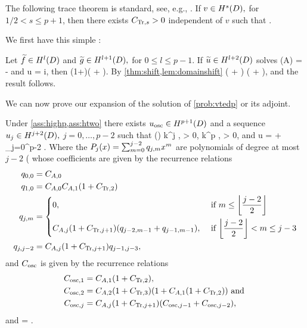 The following trace theorem is standard, see, e.g., \cite[Theorem 3.37]{Mc:00}.
\label{thm:trace}
If $v \in \HsD,$ for $1/2 < s \leq p+1$, then there exists $C_{\mathrm{Tr},s} > 0$ independent of $v$ such that
\beqs
{} \leq \CTrs {}.
\eeqs
\enth

We first have this simple :

\ble\label{lem:domainshift}
Let $\ftilde \in \HlD$ and $\gtilde \in \HlpoD,$ for $0 \leq l \leq p-1$. If $\utilde \in \HlptD$ solves
\beqs
\grad \cdot \mleft(A\grad \utilde\mright) = -\ftilde
\eeqs
and
\beqs
\dn u = i\gtilde,
\eeqs
then
\beqs
\NHlptD{\utilde} \leq \CAl\mleft(1+\CTrlpo\mright)\mleft(\NHlD{\ftilde} + \NHlpoD{\gtilde}\mright).
\eeqs
\ele
{}
By \cref{thm:shift,lem:domainshift}
\beqs
\NHlptD{\utilde} \leq \CAl \mleft(\NHlD{\ftilde} + \NHlphGI{\gtilde}\mright) \leq \CAl \mleft(\NHlD{\ftilde} + \CTrs\NHlpoD{\gtilde}\mright),
\eeqs
and the result follows.
\epf

We can now prove our expansion of the solution of \cref{prob:vtedp} or its adjoint.

\label{thm:expansion}
Under \cref{ass:highp,ass:htwo} there exists $\uosc \in \HppoD$ and a sequence $\usj \in \HjptD,$ $j = 0,\ldots,p-2$ such that
\beq\label{eq:expansionuj}
\NHjptD{\usj} \leq \Pj() k^j \Cfg, \Cj > 0,
\eeq
\beq\label{eq:expansionuosc}
\NHppoD{\uosc} \leq \Cosc k^p \Cfg,  \Cosc > 0,
\eeq
and
\beq\label{eq:expansionid}
u = \uosc + \sum_{j=0}^{p-2} \usj.
\eeq
Where the $P_{j}(x) = \sum_{m=0}^{j-2}q_{j,m}x^m $ are polynomials of degree at most $j-2$ ( whose coefficients are given by the recurrence relations
\begin{align}
\label{eq:p1}\pfn{0,0}&= \CAz\\
\label{eq:p2}\pfn{1,0}&  = \CAz\CAo\mleft(1+\CTrt\mright)\\
\label{eq:p3}\pfn{j,m} &=
\begin{dcases}
 0, &\tif m \leq \floor{\frac{j-2}2}\\
\CAj\mleft(1+\CTrjpo\mright) \mleft(\pfn{j-2,m-1} + \pfn{j-1,m-1}\mright),&\tif \floor{\frac{j-2}2} < m \leq j-3
\end{dcases}\\
\label{eq:p4}\pfn{j,j-2}& = \CAj\mleft(1+\CTrjpo\mright) \pfn{j-1,j-3},
\end{align}
and $C_{\mathrm{osc}}$ is given by the recurrence relations
\begin{align}
\label{eq:osc1}\Coscfn{1} &= \CAo\mleft(1+\CTrt\mright),\\
\label{eq:osc2}\Coscfn{2} &= \CAt\mleft(1+\CTrth\mright)\mleft(1 + \CAo\mleft(1+\CTrt\mright)\mright)\tand\\
\label{eq:osc3}\Coscfn{j} &= \CAfn{j}\mleft(1+\CTrfn{j+1}\mright)\mleft(\Coscfn{j-1} + \Coscfn{j-2}\mright),
\end{align}
and
\beq\label{eq:cosc}
\Cosc = \CAnk.
\eeq

